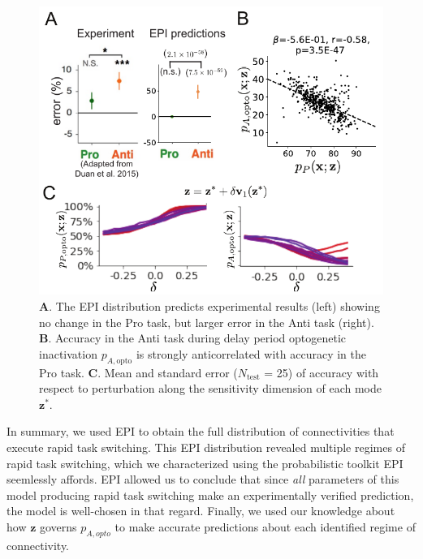 \documentclass[11pt]{article}
\begin{document}
\begin{figure}
\begin{center}
\includegraphics[scale=0.8]{figures/fig5/fig5.pdf}
\end{center}
\caption{\footnotesize 
\textbf{A}. The EPI distribution predicts experimental results (left) showing no change in the Pro task, but larger error in the Anti task (right).
\textbf{B}. Accuracy in the Anti task during delay period optogenetic inactivation $p_{A,\text{opto}}$ is strongly anticorrelated with accuracy in the Pro task.
\textbf{C}. Mean and standard error ($N_{\text{test}}$ = 25) of accuracy with respect to perturbation along the sensitivity dimension of each mode $\mathbf{z}^*$.
}
\label{fig:SC_opto}
\end{figure}

In summary, we used EPI to obtain the full distribution of connectivities that execute rapid task switching.
This EPI distribution revealed multiple regimes of rapid task switching, which we characterized using the probabilistic toolkit EPI seemlessly affords.
EPI allowed us to conclude that since \textit{all} parameters of this model producing rapid task switching make an experimentally verified prediction, the model is well-chosen in that regard.
Finally, we used our knowledge about how $\mathbf{z}$ governs $p_{A,opto}$ to make accurate predictions about each identified regime of connectivity.
\end{document}
